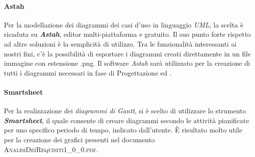 		\paragraph{Astah}
		Per la modellazione dei diagrammi dei casi d'uso in linguaggio \textit{UML}, la scelta è ricaduta su \textit{\textbf{Astah}}, editor multi-piattaforma e gratuito. Il suo punto forte rispetto ad altre soluzioni è la semplicità di utilizzo. Tra le funzionalità interessanti ai nostri fini, c'è la possibilità di esportare i diagrammi creati direttamente in un file immagine con estensione .png. Il software \textit{Astah} sarà utilizzato per la creazione di tutti i diagrammi necessari in fase di Progettazione ed \AdR.
		
		\paragraph{Smartsheet}
		Per la realizzazione dei \textit{diagrammi di Gantt}, si è scelto di utilizzare lo strumento \textit{\textbf{Smartsheet}}, il quale consente di creare diagrammi secondo le attività pianificate per uno specifico periodo di tempo, indicato dall'utente. \MakeUppercase{è} risultato molto utile per la creazione dei grafici presenti nel documento \textsc{AnalisiDeiRequisiti1\_0\_0.pdf}.
